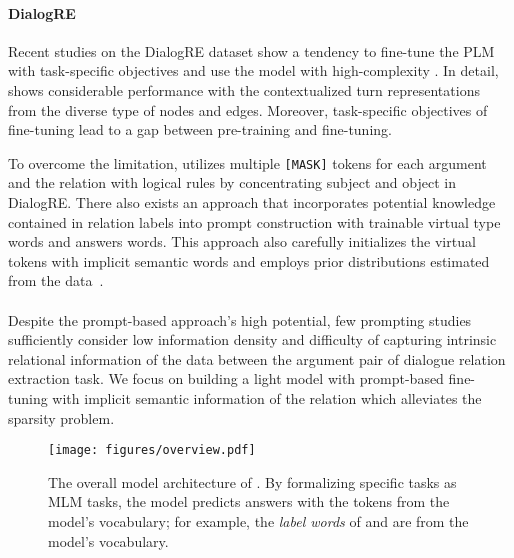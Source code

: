 \documentclass[11pt]{article}
\begin{document}
\paragraph{DialogRE}
Recent studies on the DialogRE dataset show a tendency to fine-tune the PLM with task-specific objectives and use the model with high-complexity \citep{xue2021gdpnet,ijcai2021-535,lee-choi-2021-graph}. In detail, \citet{lee-choi-2021-graph} shows considerable performance with the contextualized turn representations from the diverse type of nodes and edges. Moreover, task-specific objectives of fine-tuning lead to a gap between pre-training and fine-tuning.


To overcome the limitation, \citet{han2021ptr} utilizes multiple \texttt{[MASK]} tokens for each argument and the relation with logical rules by concentrating subject and object in DialogRE. There also exists an approach that incorporates potential knowledge contained in relation labels into prompt construction with trainable virtual type words and answers words. This approach also carefully initializes the virtual tokens with implicit semantic words and employs prior distributions estimated from the data~\citep{chen2021knowprompt}.














\paragraph{}Despite the prompt-based approach's high potential, few prompting studies sufficiently consider low information density and difficulty of capturing intrinsic relational information of the data between the argument pair of dialogue relation extraction task. We focus on building a light model with prompt-based fine-tuning with implicit semantic information of the relation which alleviates the sparsity problem.






 
\begin{figure*}[ht]
    \centering
    \texttt{[image: figures/overview.pdf]}
    \caption{The overall model architecture of . By formalizing specific tasks as MLM tasks, the model predicts answers with the tokens from the model's vocabulary; for example, the \textit{label words} of  and  are from the model's vocabulary.  \label{fig:model_overview}}
\end{figure*} 
\end{document}
